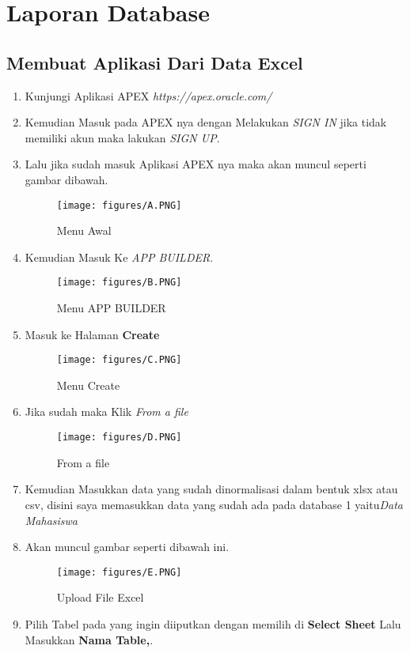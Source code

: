 \chapter{Laporan Database}
\section{Membuat Aplikasi Dari Data Excel}
\par
\begin{enumerate}
    \item Kunjungi Aplikasi APEX \textit{https://apex.oracle.com/} 
    \item Kemudian Masuk pada APEX nya dengan Melakukan \textit{SIGN IN} jika tidak memiliki akun maka lakukan \textit{SIGN UP}.
    \item Lalu jika sudah masuk Aplikasi APEX nya maka akan muncul seperti gambar dibawah.
    \begin{figure}[!htbp]
\centering
\texttt{[image: figures/A.PNG]}
\caption{Menu Awal}
\label{penanda}
\end{figure}
    \item Kemudian Masuk Ke \textit{APP BUILDER}.
\begin{figure}[!htbp]
\centering
\texttt{[image: figures/B.PNG]}
\caption{Menu APP BUILDER}
\label{penanda}
\end{figure}
    \item Masuk ke Halaman \textbf{Create}
\begin{figure}[!htbp]
\centering
\texttt{[image: figures/C.PNG]}
\caption{Menu Create}
\label{penanda}
\end{figure}
    \item Jika sudah maka Klik \textit{From a file}
\begin{figure}[!htbp]
\centering
\texttt{[image: figures/D.PNG]}
\caption{From a file}
\label{penanda}
\end{figure}
\item Kemudian Masukkan data yang sudah dinormalisasi dalam bentuk xlsx atau csv, disini saya memasukkan data yang sudah ada pada database 1 yaitu\textit{Data Mahasiswa} 
\item Akan muncul gambar seperti dibawah ini.
\begin{figure}[!htbp]
\centering
\texttt{[image: figures/E.PNG]}
\caption{Upload File Excel}
\label{penanda}
\end{figure}
\item Pilih Tabel pada yang ingin diiputkan dengan memilih di \textbf{Select Sheet} Lalu Masukkan \textbf{Nama Table,}.

\end{enumerate}

